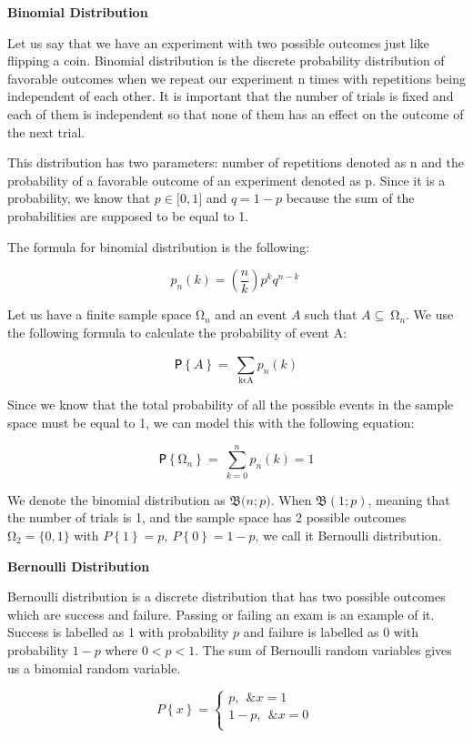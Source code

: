 \documentclass[
]{article}
\begin{document}
\textbf{Binomial Distribution}

Let us say that we have an experiment with two possible outcomes just
like flipping a coin. Binomial distribution is the discrete probability
distribution of favorable outcomes when we repeat our experiment n times
with repetitions being independent of each other. It is important that
the number of trials is fixed and each of them is independent so that
none of them has an effect on the outcome of the next trial.

This distribution has two parameters: number of repetitions denoted as n
and the probability of a favorable outcome of an experiment denoted as
p. Since it is a probability, we know that \(p \in \lbrack 0,1\rbrack\)
and \(q = 1 - p\) because the sum of the probabilities are supposed to
be equal to 1.

The formula for binomial distribution is the following:

\[p_{n}(k) = \left( \frac{n}{k} \right)p^{k}q^{n - k}\ \]

Let us have a finite sample space \(\mathrm{\Omega}_{n}\) and an event
\(A\) such that \(A \subseteq \ \mathrm{\Omega}_{n}\). We use the
following formula to calculate the probability of event A:

\[ꓑ\left\{ A \right\} = \ \sum_{\text{kϵA}}^{}{p_{n}(k)}\]

Since we know that the total probability of all the possible events in
the sample space must be equal to 1, we can model this with the
following equation:

\[ꓑ\left\{ \mathrm{\Omega}_{n} \right\} = \ \sum_{k = 0}^{n}{p_{n}(k)} = 1\]

We denote the binomial distribution as \(\mathfrak{B(}n;p)\). When
\(\mathfrak{B}(1;p)\), meaning that the number of trials is 1, and the
sample space has 2 possible outcomes \(\mathrm{\Omega}_{2} = \{ 0,1\}\)
with \(P\left\{ 1 \right\} = p,\ P\left\{ 0 \right\} = 1 - p\), we call
it Bernoulli distribution.

\textbf{Bernoulli Distribution}

Bernoulli distribution is a discrete distribution that has two possible
outcomes which are success and failure. Passing or failing an exam is an
example of it. Success is labelled as 1 with probability \(p\) and
failure is labelled as 0 with probability \(1 - p\) where \(0 < p < 1\).
The sum of Bernoulli random variables gives us a binomial random
variable.

\[P\left\{ x \right\} = \left\{ \begin{matrix}
p,\ \ \& x = 1 \\
1 - p,\ \ \& x = 0 \\
\end{matrix} \right.\ \]
\end{document}
